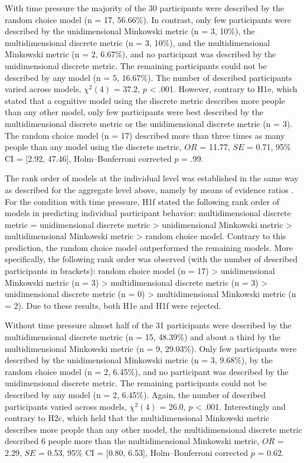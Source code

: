 \documentclass[a4paper,man,natbib]{apa6}
\begin{document}
With time pressure the majority of the 30 participants were described by the random choice model (n = 17, 56.66\%). In contrast, only few participants were described by the unidimensional Minkowski metric (n = 3, 10\%), the multidimensional discrete metric (n = 3, 10\%), and the multidimensional Minkowski metric (n = 2, 6.67\%), and no participant was described by the unidimensional discrete metric. The remaining participants could not be described by any model (n = 5, 16.67\%). The number of described participants varied across models, $\chi^{2}(4)$ = 37.2, $p$ < .001. However, contrary to H1e, which stated that a cognitive model using the discrete metric describes more people than any other model, only few participants were best described by the multidimensional discrete metric or the unidimensional discrete metric (n = 3). The random choice model (n = 17) described more than three times as many people than any model using the discrete metric, $OR$ = 11.77, $SE$ = 0.71, 95\% CI = [2.92, 47.46], Holm--Bonferroni corrected $p$ = .99. 

The rank order of models at the individual level was established in the same way as described for the aggregate level above, namely by means of evidence ratios \citep[see also][p. 194]{wagenmakers2004aic}. For the condition with time pressure, H1f stated the following rank order of models in predicting individual participant behavior: multidimensional discrete metric = unidimensional discrete metric > unidimensional Minkowski metric > multidimensional Minkowski metric > random choice model. Contrary to this prediction, the random choice model outperformed the remaining models. More specifically, the following rank order was observed (with the number of described participants in brackets): random choice model (n = 17) > unidimensional Minkowski metric (n = 3) > multidimensional discrete metric (n = 3) > unidimensional discrete metric (n = 0) > multidimensional Minkowski metric (n = 2). Due to these results, both H1e and H1f were rejected.

Without time pressure almost half of the 31 participants were described by the multidimensional discrete metric (n = 15, 48.39\%) and about a third by the multidimensional Minkowski metric (n = 9, 29.03\%). Only few participants were described by the unidimensional Minkowski metric (n = 3, 9.68\%), by the random choice model (n = 2, 6.45\%), and no participant was described by the unidimensional discrete metric. The remaining participants could not be described by any model (n = 2, 6.45\%). Again, the number of described participants varied across models, $\chi^{2}(4)$ = 26.0, $p$ < .001. Interestingly and contrary to H2c, which held that the multidimensional Minkowski metric describes more people than any other model, the multidimensional discrete metric described 6 people more than the multidimensional Minkowski metric, $OR$ = 2.29, $SE$ = 0.53, 95\% CI = [0.80, 6.53], Holm--Bonferroni corrected $p$ = 0.62. 
\end{document}
